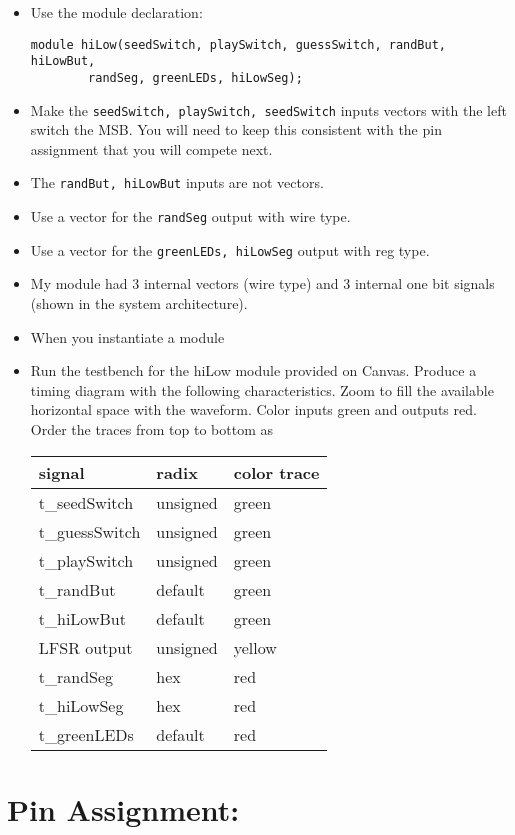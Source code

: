 \begin{itemize}
\item
  Use the module declaration:

\begin{verbatim}
module hiLow(seedSwitch, playSwitch, guessSwitch, randBut, hiLowBut,
		randSeg, greenLEDs, hiLowSeg); 
\end{verbatim}

\item
  Make the \verb+seedSwitch, playSwitch, seedSwitch+ inputs vectors with the
  left switch the MSB. You will need to keep this consistent with the
  pin assignment that you will compete next.
\item
  The \verb+randBut, hiLowBut+ inputs are not vectors.
\item
  Use a vector for the \verb+randSeg+ output with wire type.
\item
  Use a vector for the \verb+greenLEDs, hiLowSeg+ output with reg type.
\item
  My module had 3 internal vectors (wire type) and 3 internal one bit
  signals (shown in the system architecture).
\item
  When you instantiate a module
\item
  Run the testbench for the hiLow module provided on Canvas. Produce a
  timing diagram with the following characteristics. Zoom to fill the
  available horizontal space with the waveform. Color inputs green and
  outputs red. Order the traces from top to bottom as

\begin{tabular}{p{4cm}p{4cm}p{4cm}}
signal & radix & color trace \\ \hline
    t\_seedSwitch & unsigned  & green  \\
    t\_guessSwitch & unsigned & green  \\
    t\_playSwitch & unsigned & green  \\
    t\_randBut & default & green  \\
    t\_hiLowBut & default & green  \\
    LFSR output & unsigned & yellow \\
    t\_randSeg & hex & red  \\
    t\_hiLowSeg & hex & red  \\
    t\_greenLEDs & default & red  \\
  \end{tabular}
\end{itemize}


\hypertarget{pin-assignment}{%
\section{Pin Assignment:}\label{section:HiLoPin-assignment}}


